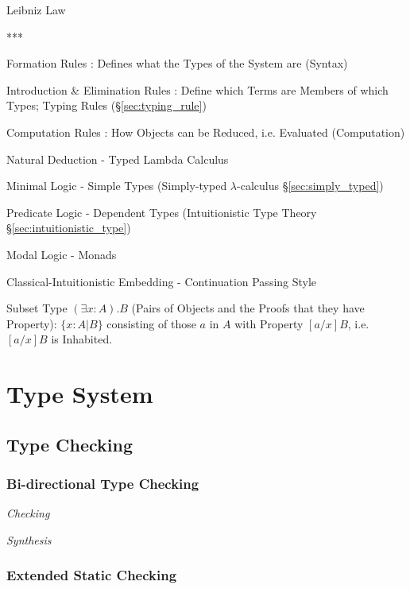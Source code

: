 Leibniz Law

***

Formation Rules : Defines what the Types of the System are (Syntax)

Introduction \& Elimination Rules : Define which Terms are Members of
which Types; Typing Rules (\S\ref{sec:typing_rule})

Computation Rules : How Objects can be Reduced, i.e. Evaluated
(Computation)

Natural Deduction - Typed Lambda Calculus

Minimal Logic - Simple Types (Simply-typed $\lambda$-calculus
\S\ref{sec:simply_typed})

Predicate Logic - Dependent Types (Intuitionistic Type Theory
\S\ref{sec:intuitionistic_type})

Modal Logic - Monads

Classical-Intuitionistic Embedding - Continuation Passing Style

Subset Type $(\exists x:A).B$ (Pairs of Objects and the Proofs that
they have Property): $\{ x : A | B \}$ consisting of those $a$ in $A$
with Property $[a/x]B$, i.e. $[a/x]B$ is Inhabited.



\section{Type System}\label{sec:type_system}

\subsection{Type Checking}\label{sec:type_checking}

\subsubsection{Bi-directional Type Checking}
\label{sec:bidirectional_checking}

\emph{Checking}

\emph{Synthesis}



\subsubsection{Extended Static Checking}\label{sec:extended_static}



